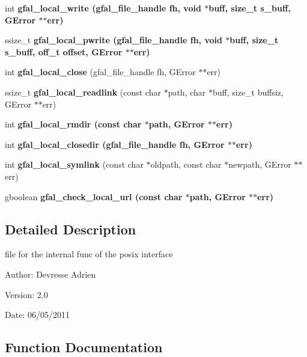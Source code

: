 \begin{CompactItemize}
\item 
int \bf{gfal\_\-local\_\-write} (gfal\_\-file\_\-handle fh, void $\ast$buff, size\_\-t s\_\-buff, GError $\ast$$\ast$err)
\item 
ssize\_\-t \bf{gfal\_\-local\_\-pwrite} (gfal\_\-file\_\-handle fh, void $\ast$buff, size\_\-t s\_\-buff, off\_\-t offset, GError $\ast$$\ast$err)
\item 
int \textbf{gfal\_\-local\_\-close} (gfal\_\-file\_\-handle fh, GError $\ast$$\ast$err)\label{gfal__posix__local__file_8c_145bf9e9edbe0321103e13a665c08d8a}

\item 
ssize\_\-t \textbf{gfal\_\-local\_\-readlink} (const char $\ast$path, char $\ast$buff, size\_\-t buffsiz, GError $\ast$$\ast$err)\label{gfal__posix__local__file_8c_e3c2e173616085706cebd8f39a854685}

\item 
int \bf{gfal\_\-local\_\-rmdir} (const char $\ast$path, GError $\ast$$\ast$err)
\item 
int \bf{gfal\_\-local\_\-closedir} (gfal\_\-file\_\-handle fh, GError $\ast$$\ast$err)
\item 
int \textbf{gfal\_\-local\_\-symlink} (const char $\ast$oldpath, const char $\ast$newpath, GError $\ast$$\ast$err)\label{gfal__posix__local__file_8c_dbae707b88f01b0a663165bbe43d314c}

\item 
gboolean \bf{gfal\_\-check\_\-local\_\-url} (const char $\ast$path, GError $\ast$$\ast$err)
\end{CompactItemize}


\subsection{Detailed Description}
file for the internal func of the posix interface 

\begin{Desc}
\item[Author:]Devresse Adrien \end{Desc}
\begin{Desc}
\item[Version:]2.0 \end{Desc}
\begin{Desc}
\item[Date:]06/05/2011 \end{Desc}


\subsection{Function Documentation}
